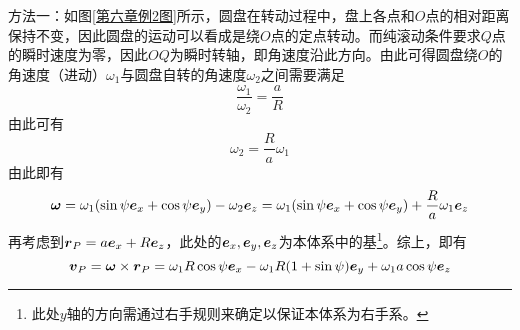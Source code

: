 \begin{solution}
{\heiti 方法一}：如图\ref{第六章例2图}所示，圆盘在转动过程中，盘上各点和$O$点的相对距离保持不变，因此圆盘的运动可以看成是绕$O$点的定点转动。而纯滚动条件要求$Q$点的瞬时速度为零，因此$OQ$为瞬时转轴，即角速度沿此方向。由此可得圆盘绕$O$的角速度（进动）$\omega_1$与圆盘自转的角速度$\omega_2$之间需要满足
\begin{equation*}
	\frac{\omega_1}{\omega_2} = \frac{a}{R}
\end{equation*}
由此可有
\begin{equation*}
	\omega_2 = \frac{R}{a} \omega_1
\end{equation*}
由此即有
\begin{equation*}
	\boldsymbol{\omega} = \omega_1 (\sin \psi \boldsymbol{e}_x + \cos \psi \boldsymbol{e}_y) - \omega_2 \boldsymbol{e}_z = \omega_1 (\sin \psi \boldsymbol{e}_x + \cos \psi \boldsymbol{e}_y) + \frac{R}{a} \omega_1 \boldsymbol{e}_z
\end{equation*}
再考虑到$\boldsymbol{r}_P = a\boldsymbol{e}_x+R\boldsymbol{e}_z$，此处的$\boldsymbol{e}_x,\boldsymbol{e}_y,\boldsymbol{e}_z$为本体系中的基\footnote{此处$y$轴的方向需通过右手规则来确定以保证本体系为右手系。}。综上，即有
\begin{equation*}
	\boldsymbol{v}_P = \boldsymbol{\omega} \times \boldsymbol{r}_P = \omega_1 R \cos \psi \boldsymbol{e}_x - \omega_1 R(1+\sin \psi) \boldsymbol{e}_y + \omega_1 a \cos \psi \boldsymbol{e}_z
\end{equation*}


\end{solution}
